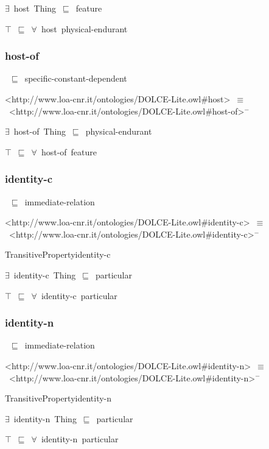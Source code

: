\documentclass{article}
\begin{document}
\ensuremath{\exists}~host~Thing~\ensuremath{\sqsubseteq}~feature

\ensuremath{\top}~\ensuremath{\sqsubseteq}~\ensuremath{\forall}~host~physical-endurant

\subsubsection*{host-of}

~\ensuremath{\sqsubseteq}~specific-constant-dependent

<http://www.loa-cnr.it/ontologies/DOLCE-Lite.owl#host>~\ensuremath{\equiv}~<http://www.loa-cnr.it/ontologies/DOLCE-Lite.owl#host-of>\ensuremath{^-}

\ensuremath{\exists}~host-of~Thing~\ensuremath{\sqsubseteq}~physical-endurant

\ensuremath{\top}~\ensuremath{\sqsubseteq}~\ensuremath{\forall}~host-of~feature

\subsubsection*{identity-c}

~\ensuremath{\sqsubseteq}~immediate-relation

<http://www.loa-cnr.it/ontologies/DOLCE-Lite.owl#identity-c>~\ensuremath{\equiv}~<http://www.loa-cnr.it/ontologies/DOLCE-Lite.owl#identity-c>\ensuremath{^-}

TransitivePropertyidentity-c

\ensuremath{\exists}~identity-c~Thing~\ensuremath{\sqsubseteq}~particular

\ensuremath{\top}~\ensuremath{\sqsubseteq}~\ensuremath{\forall}~identity-c~particular

\subsubsection*{identity-n}

~\ensuremath{\sqsubseteq}~immediate-relation

<http://www.loa-cnr.it/ontologies/DOLCE-Lite.owl#identity-n>~\ensuremath{\equiv}~<http://www.loa-cnr.it/ontologies/DOLCE-Lite.owl#identity-n>\ensuremath{^-}

TransitivePropertyidentity-n

\ensuremath{\exists}~identity-n~Thing~\ensuremath{\sqsubseteq}~particular

\ensuremath{\top}~\ensuremath{\sqsubseteq}~\ensuremath{\forall}~identity-n~particular
\end{document}
